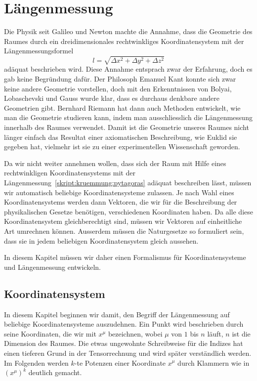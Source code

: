 %
%
%
\chapter{Längenmessung
\label{skript:kruemmung:section:laengenmessung}}
\rhead{}

Die Physik seit Galileo und Newton machte die Annahme, dass die
Geometrie des Raumes durch ein dreidimensionales rechtwinkliges
Koordinatensystem mit der Längenmessungsformel
\begin{equation}
l=\sqrt{\Delta x^2+\Delta y^2+\Delta z^2}
\label{skript:kruemmung:pytagoras}
\end{equation}
adäquat beschrieben wird.
Diese Annahme entsprach zwar der Erfahrung, doch es gab keine
Begründung dafür.
Der Philosoph Emanuel Kant konnte sich zwar keine andere Geometrie
vorstellen, doch mit den Erkenntnissen von Bolyai, Lobaschevski
und Gauss wurde klar, dass es durchaus denkbare andere Geometrien
gibt.
Bernhard Riemann hat dann auch Methoden entwickelt, wie man die
Geometrie studieren kann, indem man ausschliesslich die Längenmessung
innerhalb des Raumes verwendet.
Damit ist die Geometrie unseres Raumes nicht länger einfach das
Resultat einer axiomatischen Beschreibung, wie Euklid sie gegeben hat,
vielmehr ist sie zu einer experimentellen Wissenschaft geworden.

Da wir nicht weiter annehmen wollen, dass sich der Raum mit Hilfe
eines rechtwinkligen Koordinatensystems mit der
Längenmessung~\eqref{skript:kruemmung:pytagoras}
adäquat beschreiben lässt,
müssen wir automatisch beliebige Koordinatensysteme zulassen.
Je nach Wahl eines Koordinatensystems werden dann Vektoren, die
wir für die Beschreibung der physikalischen Gesetze benötigen,
verschiedenen Koordinaten haben.
Da alle diese Koordinatensystem gleichberechtigt sind, müssen
wir Vektoren auf einheitliche Art umrechnen können.
Ausserdem müssen die Naturgesetze so formuliert sein, dass
sie in jedem beliebigen Koordinatensystem gleich aussehen.

In diesem Kapitel müssen wir daher einen Formalismus für
Koordinatensysteme und Längenmessung entwickeln.

\section{Koordinatensystem}
In diesem Kapitel beginnen wir damit, den Begriff der Längenmessung
auf beliebige Koordinatensysteme auszudehnen.
Ein Punkt wird beschrieben durch seine Koordinaten, die wir mit
$x^\mu$ bezeichnen, wobei $\mu$ von $1$ bis $n$ läuft, $n$
ist die Dimension des Raumes. 
Die etwas ungewohnte Schreibweise für die Indizes
hat einen tieferen Grund in der Tensorrechnung und wird später
verständlich werden.
Im Folgenden werden $k$-te Potenzen einer Koordinate $x^\mu$ durch
Klammern wie in $(x^\mu)^k$ deutlich gemacht.

